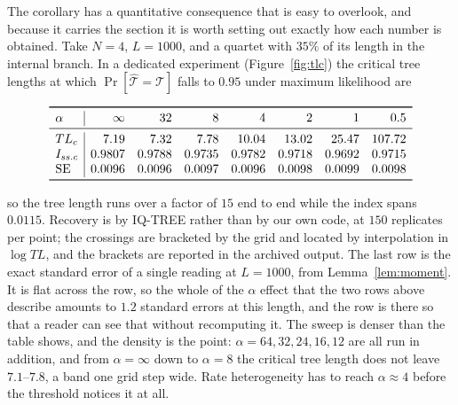 \documentclass[11pt]{article}
\newcommand{\Issc}{I_{ss.c}}
\theoremstyle{definition}
\theoremstyle{remark}
\begin{document}
\begin{sloppypar}
The corollary has a quantitative consequence that is easy to overlook, and
because it carries the section it is worth setting out exactly how each
number is obtained. Take $N=4$, $L=1000$, and a quartet with $35\%$ of its
length in the internal branch. In a dedicated experiment
(Figure~\ref{fig:tlc}) the critical tree lengths at which
$\Pr[\hat{\mathcal T}=\mathcal T]$ falls to $0.95$ under maximum likelihood
are

\begin{equation}
\begin{array}{l|rrrrrrr}
\toprule
\alpha & \infty & 32 & 8 & 4 & 2 & 1 & 0.5 \\
\midrule
TL_c      & 7.19 & 7.32 & 7.78 & 10.04 & 13.02 & 25.47 & 107.72 \\
\Issc     & 0.9807 & 0.9788 & 0.9735 & 0.9782 & 0.9718 & 0.9692 & 0.9715 \\
\mathrm{SE} & 0.0096 & 0.0096 & 0.0097 & 0.0096 & 0.0098 & 0.0099 & 0.0098 \\
\bottomrule
\end{array}
\label{eq:tlc}
\end{equation}

so the tree length runs over a factor of $15$ end to end while the index
spans $0.0115$. Recovery is by IQ-TREE rather than by our own code, at $150$
replicates per point; the crossings are bracketed by the grid and located by
interpolation in $\log TL$, and the brackets are reported in the archived
output. The last row is the exact standard error of a single reading at
$L=1000$, from Lemma~\ref{lem:moment}. It is flat across the row, so the
whole of the $\alpha$ effect that the two rows above describe amounts to
$1.2$ standard errors at this length, and the row is there so that a reader
can see that without recomputing it. The sweep is denser than the table shows, and the density is the
point: $\alpha=64,32,24,16,12$ are all run in addition, and from
$\alpha=\infty$ down to $\alpha=8$ the critical tree length does not leave
$7.1$--$7.8$, a band one grid step wide. Rate heterogeneity has to reach
$\alpha\approx4$ before the threshold notices it at all.


\end{sloppypar}
\end{document}
